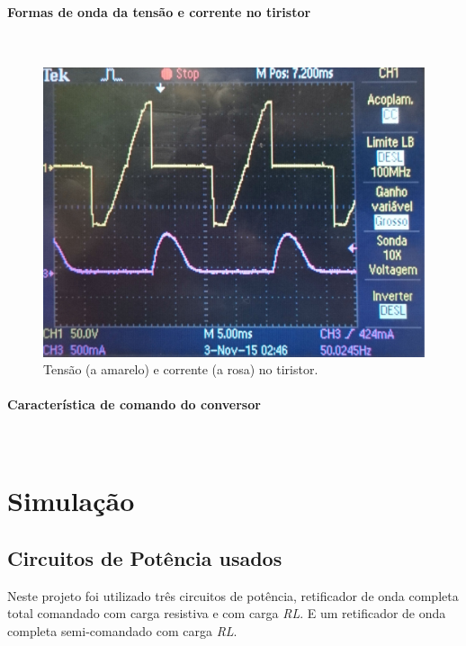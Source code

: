 \documentclass[a4paper,11pt]{article}
\numberwithin{equation}{section}
\begin{document}
\paragraph{Formas de onda da tensão e corrente no tiristor} \mbox{}\

\begin{figure}[H]
	\centering
	\includegraphics[keepaspectratio=true, scale=0.12]{img/DSC_0192}
	\caption{Tensão (a amarelo) e corrente (a rosa) no tiristor.}
	\label{fig:tctiristorsemi}
	\vspace{-0.8em}
\end{figure}

\paragraph{Característica de comando do conversor} \mbox{}\






\pagebreak
\section{Simulação}
\subsection{Circuitos de Potência usados}
Neste projeto foi utilizado três circuitos de potência, retificador de onda completa total comandado com carga resistiva e com carga \textit{RL}. E um retificador de onda completa semi-comandado com carga \textit{RL}. 
\end{document}
